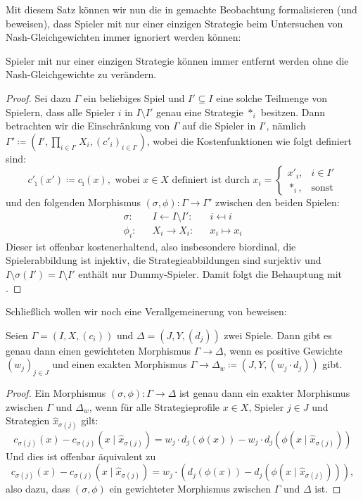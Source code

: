 Mit diesem Satz können wir nun die in  gemachte Beobachtung formalisieren (und beweisen), dass Spieler mit nur einer einzigen Strategie beim Untersuchen von Nash-Gleichgewichten immer ignoriert werden können:

\begin{kor}\label{kor:EinStratSpielerWeglassen}
	Spieler mit nur einer einzigen Strategie können immer entfernt werden ohne die Nash-Gleichgewichte zu verändern.
\end{kor}

\begin{proof}
	Sei dazu $\Gamma$ ein beliebiges Spiel und $I' \subseteq I$ eine solche Teilmenge von Spielern, dass alle Spieler $i$ in $I \setminus I'$ genau eine Strategie $\ast_i$ besitzen. Dann betrachten wir die Einschränkung von $\Gamma$ auf die Spieler in $I'$, nämlich $\Gamma' \coloneqq (I', \prod_{i \in I'}X_i, (c'_i)_{i \in I'})$, wobei die Kostenfunktionen wie folgt definiert sind:
		\[c'_{\hat{\imath}}(x') \coloneqq c_{\hat{\imath}}(x), \text{ wobei $x \in X$ definiert ist durch } x_i = \begin{cases}x'_i, &i \in I'\\ \ast_i, &\text{sonst}\end{cases}\]
	und den folgenden Morphismus $(\sigma, \phi): \Gamma \to \Gamma'$ zwischen den beiden Spielen:
	\begin{align*}
		\sigma:	&&I		\leftarrow	I\setminus I':	&&i		\mapsfrom	i  \\
		\phi_i:	&&X_i	\to	 		X_i:			&&x_i	\mapsto		x_i
	\end{align*}	
	Dieser ist offenbar kostenerhaltend, also insbesondere biordinal, die Spielerabbildung ist injektiv, die Strategieabbildungen sind surjektiv und $I\setminus \sigma(I') = I \setminus I'$ enthält nur Dummy-Spieler. Damit folgt die Behauptung mit .
\end{proof}

Schließlich wollen wir noch eine Verallgemeinerung von  beweisen:

\begin{lemma}
	Seien $\Gamma = (I, X, (c_i))$ und $\Delta = (J, Y, (d_j))$ zwei Spiele. Dann gibt es genau dann einen gewichteten Morphismus $\Gamma \to \Delta$, wenn es positive Gewichte $(w_j)_{j\in J}$ und einen exakten Morphismus $\Gamma \to \Delta_w \coloneqq (J, Y, (w_j\cdot d_j))$ gibt.
\end{lemma}

\begin{proof}
	Ein Morphismus $(\sigma, \phi): \Gamma \to \Delta$ ist genau dann ein exakter Morphismus zwischen $\Gamma$ und $\Delta_w$, wenn für alle Strategieprofile $x \in X$, Spieler $j \in J$ und Strategien $\hat{x}_{\sigma(j)}$ gilt:
		\[c_{\sigma(j)}(x) - c_{\sigma(j)}(x \mid \hat{x}_{\sigma(j)}) = w_j \cdot d_j(\phi(x)) - w_j \cdot d_j(\phi(x \mid \hat{x}_{\sigma(j)}))\]
	Und dies ist offenbar äquivalent zu
		\[c_{\sigma(j)}(x) - c_{\sigma(j)}(x \mid \hat{x}_{\sigma(j)}) = w_j \cdot \left(d_j(\phi(x)) - d_j(\phi(x \mid \hat{x}_{\sigma(j)}))\right),\]
	also dazu, dass $(\sigma, \phi)$ ein gewichteter Morphismus zwischen $\Gamma$ und $\Delta$ ist.
\end{proof}